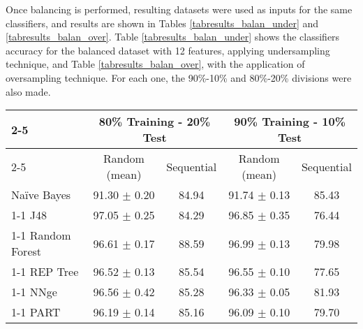 \documentclass{llncs}
\begin{document}
Once balancing is performed, resulting datasets were used as inputs for the same classifiers, and results are shown in Tables \ref{tabresults_balan_under} and \ref{tabresults_balan_over}. Table \ref{tabresults_balan_under} shows the classifiers accuracy for the balanced dataset with 12 features, applying undersampling technique, and Table \ref{tabresults_balan_over}, with the application of oversampling technique. For each one, the 90\%-10\% and 80\%-20\% divisions were also made.

\begin{table*}[htpb]
\centering
 \caption{\label{tabresults_balan_under} Percentage of correctly classified patterns for the balanced dataset with 12 features, applying undersampling technique.}
{\small
\begin{tabular}{|l|c|c|c|c|}
\cline{2-5}
\multicolumn{1}{l|}{} & \multicolumn{2}{c|}{80\% Training - 20\% Test} & \multicolumn{2}{c|}{90\% Training - 10\% Test} \\
\cline{2-5}
\multicolumn{1}{l|}{} & Random (mean) & Sequential & Random (mean) & Sequential \\
\hline
Na\"ive Bayes & 91.30 $\pm$ 0.20 & 84.94 & 91.74 $\pm$ 0.13 & 85.43 \\
\cline{1-1}
J48 & 97.05 $\pm$ 0.25 & 84.29 & 96.85 $\pm$ 0.35 & 76.44 \\
\cline{1-1}
Random Forest & 96.61 $\pm$ 0.17 & 88.59 & 96.99 $\pm$ 0.13 & 79.98 \\
\cline{1-1}
REP Tree & 96.52 $\pm$ 0.13 & 85.54 & 96.55 $\pm$ 0.10 & 77.65 \\
\cline{1-1}
NNge & 96.56 $\pm$ 0.42 & 85.28 & 96.33 $\pm$ 0.05 & 81.93 \\
\cline{1-1}
PART & 96.19 $\pm$ 0.14 & 85.16 & 96.09 $\pm$ 0.10 & 79.70 \\
\hline
\end{tabular}
}
\end{table*}
\end{document}
